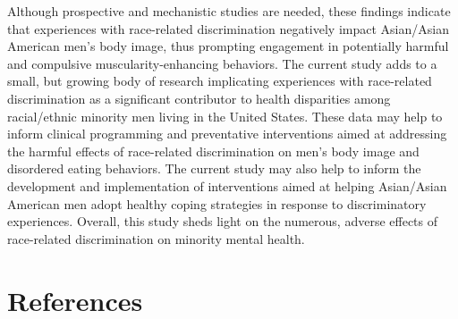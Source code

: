 \documentclass[
  english,
  man, fleqn, noextraspace,floatsintext]{apa6}
\newlength{\cslhangindent}
\newlength{\cslentryspacingunit} %
\newenvironment{CSLReferences}[2] %
 {%
  \setlength{\parindent}{0pt}
  \ifodd #1
  \let\oldpar\par
  \def\par{\hangindent=\cslhangindent\oldpar}
  \fi
  \setlength{\parskip}{#2\cslentryspacingunit}
 }%
 {}
\begin{document}
Although prospective and mechanistic studies are needed, these findings indicate that experiences with race-related discrimination negatively impact Asian/Asian American men's body image, thus prompting engagement in potentially harmful and compulsive muscularity-enhancing behaviors. The current study adds to a small, but growing body of research implicating experiences with race-related discrimination as a significant contributor to health disparities among racial/ethnic minority men living in the United States. These data may help to inform clinical programming and preventative interventions aimed at addressing the harmful effects of race-related discrimination on men's body image and disordered eating behaviors. The current study may also help to inform the development and implementation of interventions aimed at helping Asian/Asian American men adopt healthy coping strategies in response to discriminatory experiences. Overall, this study sheds light on the numerous, adverse effects of race-related discrimination on minority mental health.

\newpage

\hypertarget{references}{%
\section{References}\label{references}}

\begingroup
\setlength{\parindent}{-0.5in}
\setlength{\leftskip}{0.5in}

\hypertarget{refs}{}
\begin{CSLReferences}{0}{0}
\end{CSLReferences}

\endgroup
\end{document}
